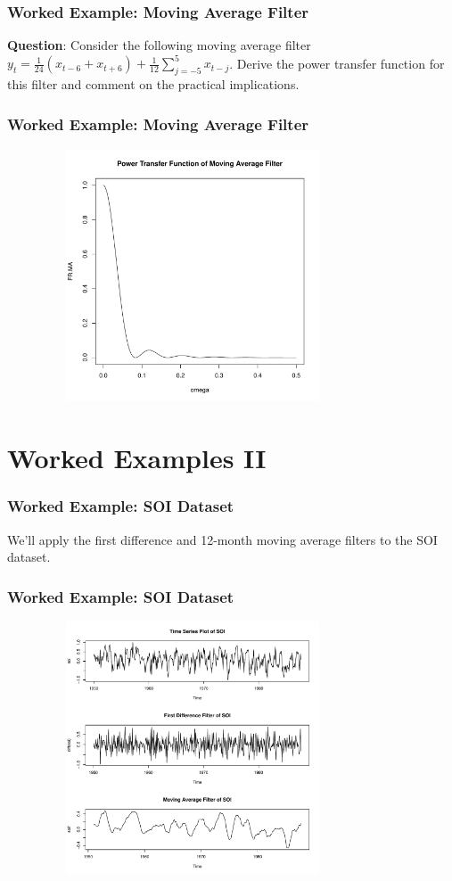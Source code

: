 \documentclass[%
xcolor=pdftex]{beamer}
\begin{document}
\begin{frame}
\frametitle{Worked Example: Moving Average Filter}

\textbf{Question}: Consider the following moving average filter $y_t = \frac{1}{24} (x_{t-6} + x_{t+6}) + \frac{1}{12}\sum_{j=-5}^5 x_{t-j}$. Derive the power transfer function for this filter and comment on the practical implications.

\vspace{50mm}

\end{frame}

\begin{frame}
\frametitle{Worked Example: Moving Average Filter}

\includegraphics[width=110mm, height=75mm]{ma.pdf}

\end{frame}

\section{Worked Examples II}
\frame{\tableofcontents[currentsection]}

\begin{frame}
\frametitle{Worked Example: SOI Dataset}

We'll apply the first difference and 12-month moving average filters to the SOI dataset.

\end{frame}

\begin{frame}
\frametitle{Worked Example: SOI Dataset}

\includegraphics[width=110mm, height=75mm]{ts.pdf}

\end{frame}
\end{document}
